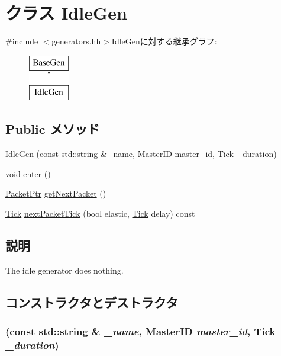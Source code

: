 \hypertarget{classIdleGen}{
\section{クラス IdleGen}
\label{classIdleGen}
}


{\ttfamily \#include $<$generators.hh$>$}IdleGenに対する継承グラフ:\begin{figure}[H]
\begin{center}
\leavevmode
\includegraphics[height=2cm]{classIdleGen}
\end{center}
\end{figure}
\subsection*{Public メソッド}
\begin{DoxyCompactItemize}
\item 
\hyperlink{classIdleGen_a8893bb38ee827d1533e0b170728ed0a7}{IdleGen} (const std::string \&\hyperlink{classBaseGen_a1b003dc5cfce1a4d8f9a0c4b9b589045}{\_\-name}, \hyperlink{request_8hh_ac366b729262fd8e7cbd3283da6f775cf}{MasterID} master\_\-id, \hyperlink{base_2types_8hh_a5c8ed81b7d238c9083e1037ba6d61643}{Tick} \_\-duration)
\item 
void \hyperlink{classIdleGen_a2759dad6560aaf485b16356d7142d69d}{enter} ()
\item 
\hyperlink{classPacket}{PacketPtr} \hyperlink{classIdleGen_a938aa9841a9a62a776afbd0768af5379}{getNextPacket} ()
\item 
\hyperlink{base_2types_8hh_a5c8ed81b7d238c9083e1037ba6d61643}{Tick} \hyperlink{classIdleGen_a65f805b54c24ac3ce0a37716de3e8abc}{nextPacketTick} (bool elastic, \hyperlink{base_2types_8hh_a5c8ed81b7d238c9083e1037ba6d61643}{Tick} delay) const 
\end{DoxyCompactItemize}


\subsection{説明}
The idle generator does nothing. 

\subsection{コンストラクタとデストラクタ}
\hypertarget{classIdleGen_a8893bb38ee827d1533e0b170728ed0a7}{
\subsubsection[{IdleGen}]{ (const std::string \& {\em \_\-name}, \/  {\bf MasterID} {\em master\_\-id}, \/  {\bf Tick} {\em \_\-duration})}}
\label{classIdleGen_a8893bb38ee827d1533e0b170728ed0a7}



